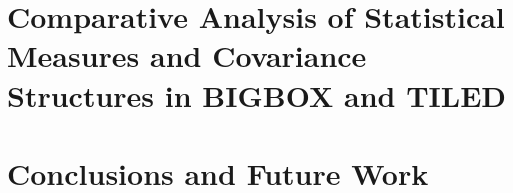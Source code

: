 \documentclass[11pt,a4paper]{ipmu}
\begin{document}
\chapter{Comparative Analysis of Statistical Measures and Covariance Structures in BIGBOX and TILED}
\label{chap:results}
\minitoc 


\chapter{Conclusions and Future Work}
\label{chap:conclusions}




\backmatter


\end{document}

